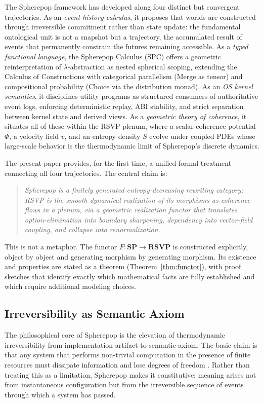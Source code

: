\documentclass[12pt, a4paper]{article}
\theoremstyle{definition}
\theoremstyle{remark}
\newcommand{\SP}{\mathbf{SP}}
\newcommand{\RSVP}{\mathbf{RSVP}}
\begin{document}
The Spherepop framework has developed along four distinct but convergent trajectories.
As an \emph{event-history calculus}, it proposes that worlds are
constructed through irreversible commitment rather than state update: the fundamental
ontological unit is not a snapshot but a trajectory, the accumulated result of events
that permanently constrain the futures remaining accessible. As a \emph{typed
functional language}, the Spherepop Calculus (SPC) offers
a geometric reinterpretation of $\lambda$-abstraction as nested spherical scoping,
extending the Calculus of Constructions with categorical parallelism (Merge as tensor)
and compositional probability (Choice via the distribution monad). As an \emph{OS
kernel semantics}, it disciplines utility programs as
structured consumers of authoritative event logs, enforcing deterministic replay,
ABI stability, and strict separation between kernel state and derived views. As a
\emph{geometric theory of coherence}, it situates all of
these within the RSVP plenum, where a scalar coherence potential $\Phi$, a velocity
field $v$, and an entropy density $S$ evolve under coupled PDEs whose large-scale
behavior is the thermodynamic limit of Spherepop's discrete dynamics.

The present paper provides, for the first time, a unified formal treatment connecting
all four trajectories. The central claim is:

\begin{quote}
\emph{Spherepop is a finitely generated entropy-decreasing rewriting category; RSVP
is the smooth dynamical realization of its morphisms as coherence flows in a plenum,
via a geometric realization functor that translates option-elimination into boundary
sharpening, dependency into vector-field coupling, and collapse into renormalization.}
\end{quote}

This is not a metaphor. The functor $F : \SP \to \RSVP$ is constructed explicitly,
object by object and generating morphism by generating morphism. Its existence and
properties are stated as a theorem (Theorem~\ref{thm:functor}), with proof sketches
that identify exactly which mathematical facts are fully established and which require
additional modeling choices.

\subsection{Irreversibility as Semantic Axiom}

The philosophical core of Spherepop is the elevation of thermodynamic irreversibility
from implementation artifact to semantic axiom. The basic claim is that any system that performs non-trivial computation in the presence of finite resources
must dissipate information and lose degrees of freedom \citep{landauer1961,
bennett1973}. Rather than treating this as a limitation, Spherepop makes it
constitutive: meaning arises not from instantaneous configuration but from the
irreversible sequence of events through which a system has passed.
\end{document}
